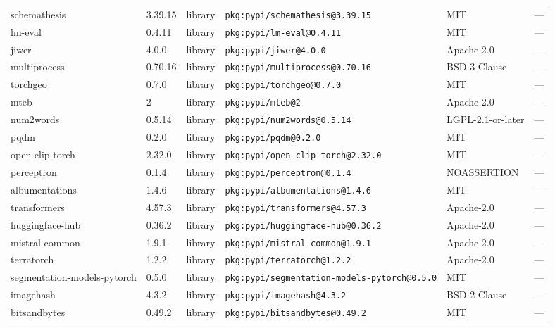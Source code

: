\documentclass[11pt,a4paper]{article}
\begin{document}
\begin{longtable}{|p{4cm}|p{2cm}|p{1.6cm}|p{5cm}|p{1.5cm}|p{3.5cm}|}
\raggedright schemathesis & 3.39.15 & library & \small\texttt{pkg:pypi/schemathesis@3.39.15} & MIT & \small — \\
\raggedright lm-eval & 0.4.11 & library & \small\texttt{pkg:pypi/lm-eval@0.4.11} & MIT & \small — \\
\raggedright jiwer & 4.0.0 & library & \small\texttt{pkg:pypi/jiwer@4.0.0} & Apache-2.0 & \small — \\
\raggedright multiprocess & 0.70.16 & library & \small\texttt{pkg:pypi/multiprocess@0.70.16} & BSD-3-Clause & \small — \\
\raggedright torchgeo & 0.7.0 & library & \small\texttt{pkg:pypi/torchgeo@0.7.0} & MIT & \small — \\
\raggedright mteb & 2 & library & \small\texttt{pkg:pypi/mteb@2} & Apache-2.0 & \small — \\
\raggedright num2words & 0.5.14 & library & \small\texttt{pkg:pypi/num2words@0.5.14} & LGPL-2.1-or-later & \small — \\
\raggedright pqdm & 0.2.0 & library & \small\texttt{pkg:pypi/pqdm@0.2.0} & MIT & \small — \\
\raggedright open-clip-torch & 2.32.0 & library & \small\texttt{pkg:pypi/open-clip-torch@2.32.0} & MIT & \small — \\
\raggedright perceptron & 0.1.4 & library & \small\texttt{pkg:pypi/perceptron@0.1.4} & NOASSERTION & \small — \\
\raggedright albumentations & 1.4.6 & library & \small\texttt{pkg:pypi/albumentations@1.4.6} & MIT & \small — \\
\raggedright transformers & 4.57.3 & library & \small\texttt{pkg:pypi/transformers@4.57.3} & Apache-2.0 & \small — \\
\raggedright huggingface-hub & 0.36.2 & library & \small\texttt{pkg:pypi/huggingface-hub@0.36.2} & Apache-2.0 & \small — \\
\raggedright mistral-common & 1.9.1 & library & \small\texttt{pkg:pypi/mistral-common@1.9.1} & Apache-2.0 & \small — \\
\raggedright terratorch & 1.2.2 & library & \small\texttt{pkg:pypi/terratorch@1.2.2} & Apache-2.0 & \small — \\
\raggedright segmentation-models-pytorch & 0.5.0 & library & \small\texttt{pkg:pypi/segmentation-models-pytorch@0.5.0} & MIT & \small — \\
\raggedright imagehash & 4.3.2 & library & \small\texttt{pkg:pypi/imagehash@4.3.2} & BSD-2-Clause & \small — \\
\raggedright bitsandbytes & 0.49.2 & library & \small\texttt{pkg:pypi/bitsandbytes@0.49.2} & MIT & \small — \\

\end{longtable}
\end{document}
